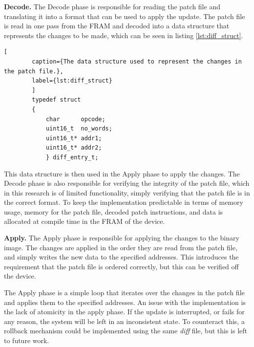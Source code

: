 \textbf{Decode.}
The Decode phase is responsible for reading the patch file and translating it into a format that can be used to apply the update. The patch file is read in one pass from the FRAM and decoded into a data structure that represents the changes to be made, which can be seen in listing \ref{lst:diff_struct}. 
\begin{framed}
    \begin{lstlisting}[
        caption={The data structure used to represent the changes in the patch file.},
        label={lst:diff_struct}
        ]
        typedef struct  
        {
            char      opcode;
            uint16_t  no_words;
            uint16_t* addr1;
            uint16_t* addr2;
            } diff_entry_t;
    \end{lstlisting}
\end{framed}
This data structure is then used in the Apply phase to apply the changes. The Decode phase is also responsible for verifying the integrity of the patch file, which in this research is of limited functionality, simply verifying that the patch file is in the correct format. To keep the implementation predictable in terms of memory usage, memory for the patch file, decoded patch instructions, and data is allocated at compile time in the FRAM of the device.

\textbf{Apply.}
The Apply phase is responsible for applying the changes to the binary image. The changes are applied in the order they are read from the patch file, and simply writes the new data to the specified addresses. This introduces the requirement that the patch file is ordered correctly, but this can be verified off the device. 

The Apply phase is a simple loop that iterates over the changes in the patch file and applies them to the specified addresses. An issue with the implementation is the lack of atomicity in the apply phase. If the update is interrupted, or fails for any reason, the system will be left in an inconsistent state. To counteract this, a rollback mechanism could be implemented using the same \textit{diff} file, but this is left to future work.

